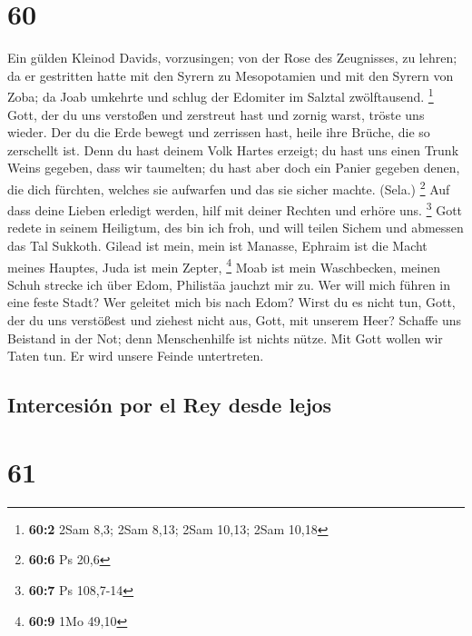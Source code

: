 \hypertarget{section-59}{%
\section{60}\label{section-59}}

 Ein gülden Kleinod Davids, vorzusingen; von der Rose des
Zeugnisses, zu lehren;  da er gestritten hatte mit den
Syrern zu Mesopotamien und mit den Syrern von Zoba; da Joab umkehrte und
schlug der Edomiter im Salztal zwölftausend. \footnote{\textbf{60:2}
  2Sam 8,3; 2Sam 8,13; 2Sam 10,13; 2Sam 10,18}  Gott, der
du uns verstoßen und zerstreut hast und zornig warst, tröste uns wieder.
 Der du die Erde bewegt und zerrissen hast, heile ihre
Brüche, die so zerschellt ist.  Denn du hast deinem Volk
Hartes erzeigt; du hast uns einen Trunk Weins gegeben, dass wir
taumelten;  du hast aber doch ein Panier gegeben denen,
die dich fürchten, welches sie aufwarfen und das sie sicher machte.
(Sela.) \footnote{\textbf{60:6} Ps 20,6}  Auf dass deine
Lieben erledigt werden, hilf mit deiner Rechten und erhöre uns.
\footnote{\textbf{60:7} Ps 108,7-14}  Gott redete in
seinem Heiligtum, des bin ich froh, und will teilen Sichem und abmessen
das Tal Sukkoth.  Gilead ist mein, mein ist Manasse,
Ephraim ist die Macht meines Hauptes, Juda ist mein Zepter, \footnote{\textbf{60:9}
  1Mo 49,10}  Moab ist mein Waschbecken, meinen Schuh
strecke ich über Edom, Philistäa jauchzt mir zu.  Wer
will mich führen in eine feste Stadt? Wer geleitet mich bis nach Edom?
 Wirst du es nicht tun, Gott, der du uns verstößest und
ziehest nicht aus, Gott, mit unserem Heer?  Schaffe uns
Beistand in der Not; denn Menschenhilfe ist nichts nütze.
 Mit Gott wollen wir Taten tun. Er wird unsere Feinde
untertreten.

\hypertarget{intercesiuxf3n-por-el-rey-desde-lejos}{%
\subsection{Intercesión por el Rey desde
lejos}\label{intercesiuxf3n-por-el-rey-desde-lejos}}

\hypertarget{section-60}{%
\section{61}\label{section-60}}

